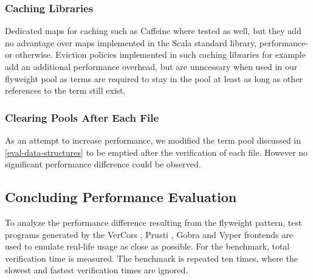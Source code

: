 \documentclass[11pt]{article}
\begin{document}
    \subsubsection{Caching Libraries}

    Dedicated maps for caching such as Caffeine \cite{caffeine} where tested as well,
    but they add no advantage over maps
    implemented in the Scala standard library, performance- or otherwise.
    Eviction policies implemented in such caching libraries for example
    add an additional performance overhead, but are unncessary when used
    in our flyweight pool as terms are required to stay in the pool at least as long
    as other references to the term still exist. 

    \subsubsection{Clearing Pools After Each File}

    As an attempt to increase performance, we modified
    the term pool discussed in \ref{eval-data-structures} to be emptied
    after the verification of each file. However no significant
    performance difference could be observed.



    

    \subsection{Concluding Performance Evaluation} \label{eval-conclusion}

    To analyze the performance difference resulting
    from the flyweight pattern, test programs generated by the VerCors \cite{vercors},
    Prusti \cite{prusti}, Gobra \cite{gobra} and Vyper \cite{vyper} frontends are used
    to emulate real-life usage as close as possible.
    For the benchmark, total verification time  is measured.
    The benchmark is repeated ten times, where the
    slowest and fastest verification times are ignored.
    
\end{document}

